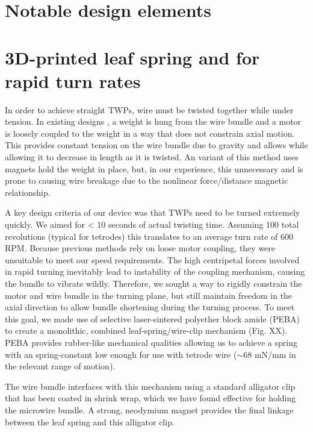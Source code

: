 \documentclass[11pt,a4paper]{article}
\begin{document}
\section{Notable design elements}

\section{3D-printed leaf spring and for rapid turn rates}
In order to achieve straight TWPs, wire must be twisted together while under
tension. In existing designs \cite{}, a weight is hung from the wire bundle and
a motor is loosely coupled to the weight in a way that does not constrain axial
motion. This provides constant tension on the wire bundle due to gravity and
allows while allowing it to decrease in length as it is twisted. An variant of
this method uses magnets hold the weight in place, but, in our experience, this
unnecessary and is prone to causing wire breakage due to the nonlinear
force/distance magnetic relationship.

A key design criteria of our device was that TWPs need to be turned extremely
quickly. We aimed for < 10 seconds of actual twisting time. Assuming 100 total
revolutions (typical for tetrodes) this translates to an average turn rate of
600 RPM. Because previous methods rely on loose motor coupling, they were
unsuitable to meet our speed requirements. The high centripetal forces involved
in rapid turning inevitably lead to instability of the coupling mechanism,
causing the bundle to vibrate wildly. Therefore, we sought a way to rigidly
constrain the motor and wire bundle in the turning plane, but still maintain
freedom in the axial direction to allow bundle shortening during the turning
process. To meet this goal, we made use of selective laser-sintered polyether
block amide (PEBA) to create a monolithic, combined leaf-spring/wire-clip
mechanism (Fig. XX). PEBA provides rubber-like mechanical qualities allowing
us to achieve a spring with an spring-constant low enough for use with tetrode
wire ($\sim$68 mN/mm in the relevant range of motion). 

The wire bundle interfaces with this mechanism using a standard alligator clip
that has been coated in shrink wrap, which we have found effective for holding
the microwire bundle. A strong, neodymium magnet provides the final linkage
between the leaf spring and this alligator clip.
\end{document}
